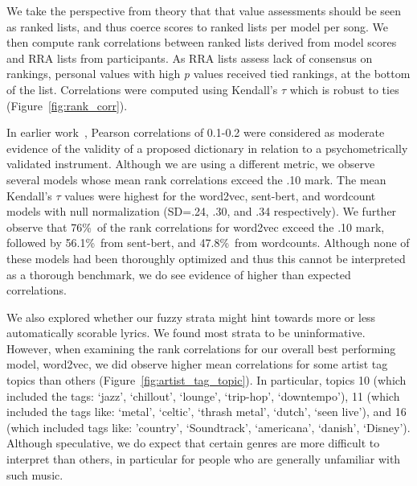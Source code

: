 \documentclass{article}
\begin{document}
We take the perspective from theory that that value assessments should be seen as ranked lists, and thus coerce scores to ranked lists per model per song. We then compute rank correlations between ranked lists derived from model scores and RRA lists from participants. As RRA lists assess lack of consensus on rankings, personal values with high \textit{p} values received tied rankings, at the bottom of the list. Correlations were computed using Kendall's $\tau$ which is robust to ties (Figure~\ref{fig:rank_corr}).  

In earlier work~\cite{richard2003one, ponizovskiy2020development}, Pearson correlations of 0.1-0.2 were considered as moderate evidence of the validity of a proposed dictionary in relation to a psychometrically validated instrument. Although we are using a different metric, we observe several models whose mean rank correlations exceed the .10 mark. The mean Kendall's $\tau$ values were highest for the word2vec, sent-bert, and wordcount models with null normalization (SD=.24, .30, and .34 respectively). We further observe that 76\%\ of the rank correlations for word2vec exceed the .10 mark, followed by 56.1\%\ from sent-bert, and 47.8\%\ from wordcounts. Although none of these models had been thoroughly optimized and thus this cannot be interpreted as a thorough benchmark, we do see evidence of higher than expected correlations. 

We also explored whether our fuzzy strata might hint towards more or less automatically scorable lyrics. We found most strata to be uninformative. However, when examining the rank correlations for our overall best performing model, word2vec, we did observe higher mean correlations for some artist tag topics than others (Figure~\ref{fig:artist_tag_topic}). In particular, topics 10 (which included the tags: ‘jazz’, ‘chillout’, ‘lounge’, ‘trip-hop’, ‘downtempo’), 11 (which included the tags like: ‘metal’, ‘celtic’, ‘thrash metal’, ‘dutch’, ‘seen live’), and 16 (which included tags like: 'country’, ‘Soundtrack’, ‘americana’, ‘danish’, ‘Disney’). Although speculative, we do expect that certain genres are more difficult to interpret than others, in particular for people who are generally unfamiliar with such music.  
\end{document}
